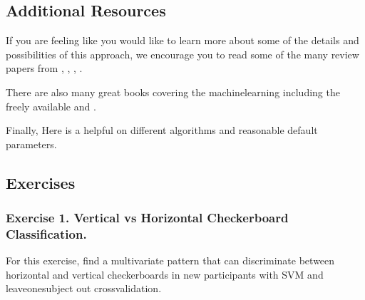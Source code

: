 \documentclass[letterpaper,10pt,english]{sphinxmanual}
\begin{document}
\noindent{}

\begin{sphinxVerbatim}[commandchars=\\\{\}]
\end{sphinxVerbatim}

\noindent{}


\subsection{Additional Resources}
\label{\detokenize{content/Multivariate_Prediction:additional-resources}}
If you are feeling like you would like to learn more about some of the details and possibilities of this approach, we encourage you to read some of the many review papers from , , , .

There are also many great books covering the machine\sphinxhyphen{}learning including the freely available  and .

Finally, Here is a helpful  on different algorithms and reasonable default parameters.


\subsection{Exercises}
\label{\detokenize{content/Multivariate_Prediction:exercises}}

\subsubsection{Exercise 1. Vertical vs Horizontal Checkerboard Classification.}
\label{\detokenize{content/Multivariate_Prediction:exercise-1-vertical-vs-horizontal-checkerboard-classification}}
For this exercise, find a multivariate pattern that can discriminate between horizontal and vertical checkerboards in new participants with SVM and leave\sphinxhyphen{}one\sphinxhyphen{}subject out cross\sphinxhyphen{}validation.
\end{document}
